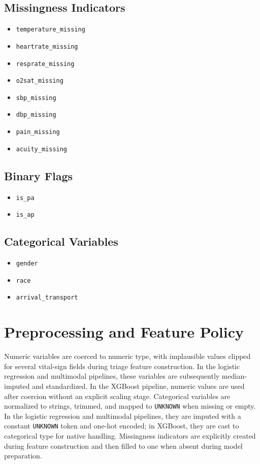 \subsection*{Missingness Indicators}
\begin{itemize}
    \item \texttt{temperature\_missing}
    \item \texttt{heartrate\_missing}
    \item \texttt{resprate\_missing}
    \item \texttt{o2sat\_missing}
    \item \texttt{sbp\_missing}
    \item \texttt{dbp\_missing}
    \item \texttt{pain\_missing}
    \item \texttt{acuity\_missing}
\end{itemize}

\subsection*{Binary Flags}
\begin{itemize}
    \item \texttt{is\_pa}
    \item \texttt{is\_ap}
\end{itemize}

\subsection*{Categorical Variables}
\begin{itemize}
    \item \texttt{gender}
    \item \texttt{race}
    \item \texttt{arrival\_transport}
\end{itemize}

\section{Preprocessing and Feature Policy}

Numeric variables are coerced to numeric type, with implausible values clipped for several vital-sign fields during triage feature construction. In the logistic regression and multimodal pipelines, these variables are subsequently median-imputed and standardized. In the XGBoost pipeline, numeric values are used after coercion without an explicit scaling stage. Categorical variables are normalized to strings, trimmed, and mapped to \texttt{UNKNOWN} when missing or empty. In the logistic regression and multimodal pipelines, they are imputed with a constant \texttt{UNKNOWN} token and one-hot encoded; in XGBoost, they are cast to categorical type for native handling. Missingness indicators are explicitly created during feature construction and then filled to one when absent during model preparation.


